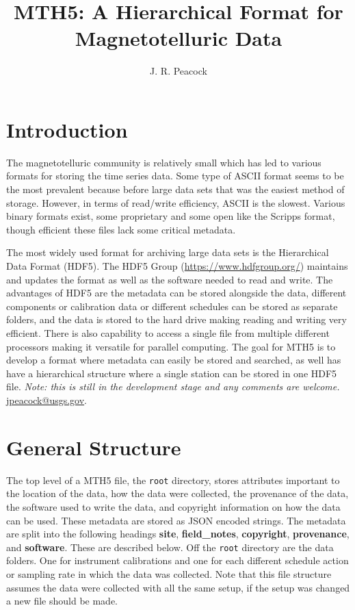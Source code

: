 \documentclass{article}
\title{\textbf{MTH5}: A Hierarchical Format for Magnetotelluric Data}
\author[1]{J. R. Peacock}
\affil[1]{U.S. Geological Survey}
\newcommand{\attr}[1]{\textbf{#1}}
\begin{document}
	
\maketitle
	
\newpage

\tableofcontents

\newpage

\section{Introduction}

The magnetotelluric community is relatively small which has led to various formats for storing the time series data.  Some type of ASCII format seems to be the most prevalent because before large data sets that was the easiest method of storage.  However, in terms of read/write efficiency, ASCII is the slowest.  Various binary formats exist, some proprietary and some open like the Scripps format, though efficient these files lack some critical metadata. 

The most widely used format for archiving large data sets is the Hierarchical Data Format (HDF5).  The HDF5 Group (\url{https://www.hdfgroup.org/}) maintains and updates the format as well as the software needed to read and write.  The advantages of HDF5 are the metadata can be stored alongside the data, different components or calibration data or different schedules can be stored as separate folders, and the data is stored to the hard drive making reading and writing very efficient.  There is also capability to access a single file from multiple different processors making it versatile for parallel computing.  The goal for MTH5 is to develop a format where metadata can easily be stored and searched, as well has have a hierarchical structure where a single station can be stored in one HDF5 file.  \textit{Note: this is still in the development stage and any comments are welcome.} \url{jpeacock@usgs.gov}. 
 

\section{General Structure}

The top level of a MTH5 file, the \verb|root| directory, stores attributes important to the location of the data, how the data were collected, the provenance of the data, the software used to write the data, and copyright information on how the data can be used.  These metadata are stored as JSON encoded strings.  The metadata are split into the following headings \attr{site}, \attr{field\_notes}, \attr{copyright}, \attr{provenance}, and \attr{software}. These are described below. Off the \verb|root| directory are the data folders.  One for instrument calibrations and one for each different schedule action or sampling rate in which the data was collected. Note that this file structure assumes the data were collected with all the same setup, if the setup was changed a new file should be made.  
\end{document}

